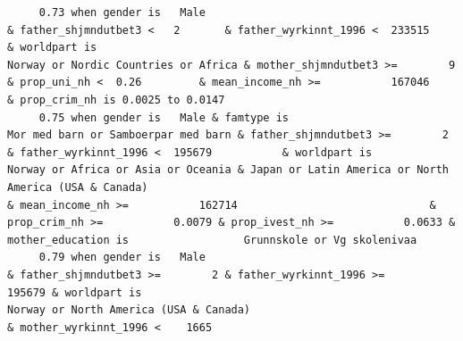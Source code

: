 \documentclass[
  letterpaper,
  DIV=11,
  numbers=noendperiod]{scrreprt}
\begin{document}
\begin{verbatim}
     0.73 when gender is   Male                                                                               & father_shjmndutbet3 <   2       & father_wyrkinnt_1996 <  233515           & worldpart is                                                                                                Norway or Nordic Countries or Africa & mother_shjmndutbet3 >=        9                                                                                          & prop_uni_nh <  0.26         & mean_income_nh >=           167046                              & prop_crim_nh is 0.0025 to 0.0147                                                                                                                                                                                                                                                                            
     0.75 when gender is   Male & famtype is                              Mor med barn or Samboerpar med barn & father_shjmndutbet3 >=        2 & father_wyrkinnt_1996 <  195679           & worldpart is                                        Norway or Africa or Asia or Oceania & Japan or Latin America or North America (USA & Canada)                                                                                                                                                          & mean_income_nh >=           162714                              & prop_crim_nh >=           0.0079 & prop_ivest_nh >=           0.0633 & mother_education is                  Grunnskole or Vg skolenivaa                                                                                                                                                                     
     0.79 when gender is   Male                                                                               & father_shjmndutbet3 >=        2 & father_wyrkinnt_1996 >=           195679 & worldpart is                                                                                              Norway or North America (USA & Canada)                                   & mother_wyrkinnt_1996 <    1665                                                                                                                                                                                                                                                                                                                                                                                                                                                                       

\end{verbatim}
\end{document}
